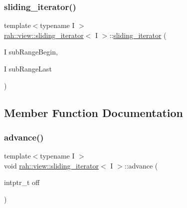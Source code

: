 \subsubsection{\texorpdfstring{sliding\_iterator()}{sliding\_iterator()}\hspace{0.1cm}{\footnotesize\ttfamily [2/2]}}
{\footnotesize\ttfamily template$<$typename I $>$ \\
\mbox{\hyperlink{structrah_1_1view_1_1sliding__iterator}{rah\+::view\+::sliding\+\_\+iterator}}$<$ I $>$\+::\mbox{\hyperlink{structrah_1_1view_1_1sliding__iterator}{sliding\+\_\+iterator}} (\begin{DoxyParamCaption}\item[{I}]{sub\+Range\+Begin,  }\item[{I}]{sub\+Range\+Last }\end{DoxyParamCaption})\hspace{0.3cm}{\ttfamily [inline]}}



\subsection{Member Function Documentation}
\mbox{\label{structrah_1_1view_1_1sliding__iterator_a5a26e1f5ef1cdf607f4f25668f929bf2}} 
\subsubsection{\texorpdfstring{advance()}{advance()}}
{\footnotesize\ttfamily template$<$typename I $>$ \\
void \mbox{\hyperlink{structrah_1_1view_1_1sliding__iterator}{rah\+::view\+::sliding\+\_\+iterator}}$<$ I $>$\+::advance (\begin{DoxyParamCaption}\item[{intptr\+\_\+t}]{off }\end{DoxyParamCaption})\hspace{0.3cm}{\ttfamily [inline]}}

\mbox{\label{structrah_1_1view_1_1sliding__iterator_a51d7291b82f8319983ba71318fce02c8}} 
